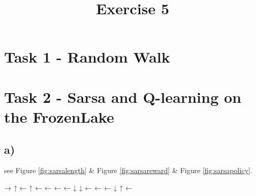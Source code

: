 \documentclass[a4paper]{article}
\date{}
\author{}
\title{\textbf{Exercise 5}}
\begin{document}
\maketitle 
\thispagestyle{fancy}

\section*{Task 1 - Random Walk}


\section*{Task 2 - Sarsa and Q-learning on the FrozenLake}

\subsection*{a)}
see Figure \ref{fig:sarsalength} \& Figure \ref{fig:sarsareward} \& Figure \ref{fig:sarsapolicy}.

→ ↑ ← ↑
← ← ← ←
↓ ↓ ← ←
← ↓ ↑ ←
\end{document}
